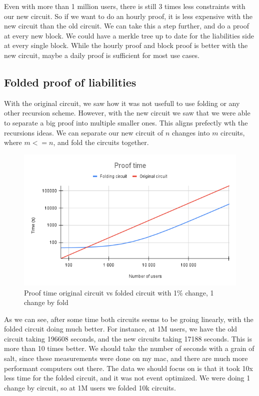Even with more than 1 million users, there is still 3 times less constraints with our new circuit.
So if we want to do an hourly proof, it is less expensive with the new circuit than the old circuit.
We can take this a step further, and do a proof at every new block. We could have a merkle tree up to date for the liabilities side at every single block.
While the hourly proof and block proof is better with the new circuit, maybe a daily proof is sufficient for most use cases.

\subsection{Folded proof of liabilities}
With the original circuit, we saw how it was not usefull to use folding or any other recursion scheme.
However, with the new circuit we saw that we were able to separate a big proof into multiple smaller ones.
This aligns prefectly wth the recursions ideas.
We can separate our new circuit of $n$ changes into $m$ circuits, where $m <= n$, and fold the circuits together.

\begin{figure}[H]
   \centering
   \includegraphics[width=130mm]{Proof time.png}
   \caption{Proof time original circuit vs folded circuit with 1\% change, 1 change by fold}
   \label{overflow}
   \end{figure}

As we can see, after some time both circuits seems to be groing linearly, with the folded circuit doing much better. For instance,
at 1M users, we have the old circuit taking 196608 seconds, and the new circuits taking 17188 seconds. This is more than 10 times better.
We should take the number of seconds with a grain of salt, since these measurements were done on my mac, and there are much more performant computers out there.
The data we should focus on is that it took 10x less time for the folded circuit, and it was not event optimized. We were doing 1 change by circuit, so at 1M users we folded 10k circuits.


